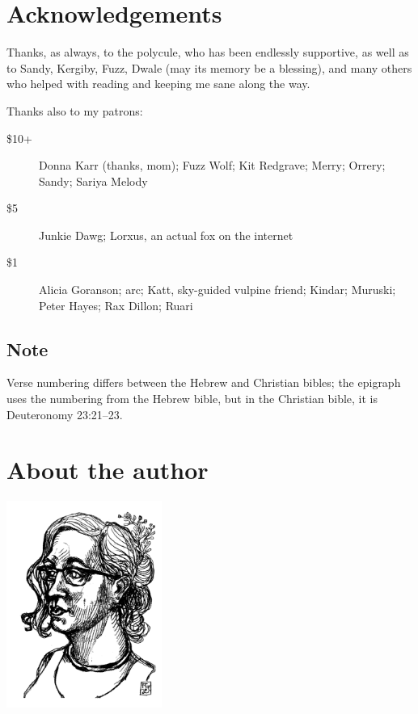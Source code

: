 \chapter*{Acknowledgements}

Thanks, as always, to the polycule, who has been endlessly supportive, as well as to Sandy, Kergiby, Fuzz, Dwale (may its memory be a blessing), and many others who helped with reading and keeping me sane along the way.

Thanks also to my patrons:

\begin{description}
    \item[\$10+]
    Donna Karr (thanks, mom); Fuzz Wolf; Kit Redgrave; Merry; Orrery; Sandy; Sariya Melody

    \item[\$5]
    Junkie Dawg; Lorxus, an actual fox on the internet

    \item[\$1]
    Alicia Goranson; arc; Katt, sky-guided vulpine friend; Kindar; Muruski; Peter Hayes; Rax Dillon; Ruari
\end{description}

\section*{Note}

Verse numbering differs between the Hebrew and Christian bibles; the epigraph uses the numbering from the Hebrew bible, but in the Christian bible, it is Deuteronomy 23:21--23.

\chapter*{About the author}

\begin{center}
  \includegraphics[width=2in]{content/headshot.png}
\end{center}

